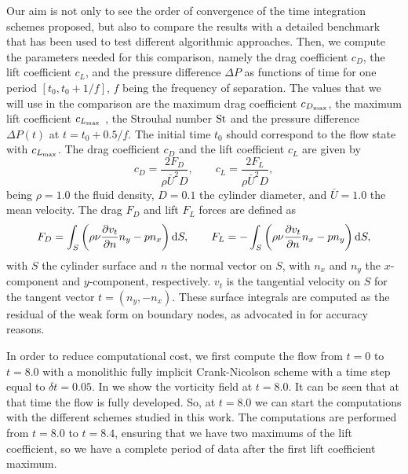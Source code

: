 Our aim is not only to see the order of convergence of the time integration schemes proposed, but also to compare the results with a detailed benchmark that has been used to test different algorithmic approaches. Then, we compute the parameters needed for this comparison, namely the drag coefficient $c_D$, the lift coefficient $c_L$, and the pressure difference $\Delta P$ as functions of time for one period $[t_0,t_0+1/f]$, $f$ being the frequency of separation. The values that we will use in the comparison are the maximum drag coefficient $c_{D_{\rm max}}$, the maximum lift coefficient $c_{L_{\rm max}}$ , the Strouhal number ${\rm St}$ and the pressure difference $\Delta P(t)$ at $t=t_0+0.5/f$. The initial time $t_0$ should correspond to the flow state with $c_{L_{\rm max}}$. The drag coefficient $c_D$ and  the lift coefficient $c_L$ are given by $$c_D=\frac{2F_D}{\rho\bar{U}^2D},\quad\quad c_L=\frac{2F_L}{\rho\bar{U}^2D},$$
being $\rho=1.0$ the fluid density, $D=0.1$ the cylinder diameter, and $\bar{U}=1.0$ the mean velocity. The drag $F_D$ and lift $F_L$ forces are defined as $$F_D=\int_S\left(\rho\nu\frac{\partial v_t}{\partial n}n_y-pn_x\right){\rm d}S,\quad\quad F_L=-\int_S\left(\rho\nu\frac{\partial v_t}{\partial n}n_x-pn_y\right){\rm d}S,$$
with $S$ the cylinder surface and $n$ the normal vector on $S$, with $n_x$ and $n_y$ the $x$-component and $y$-component, respectively. $v_t$ is the tangential velocity on $S$ for the tangent vector $t=(n_y,-n_x)$. These surface integrals are computed as the residual of the weak form on boundary nodes, as advocated in \cite{brezzi_variational_2001} for accuracy reasons.

In order to reduce computational cost, we first compute the flow from $t=0$ to $t=8.0$ with a monolithic fully implicit Crank-Nicolson scheme with a time step equal to $\delta t=0.05$. In  we show the vorticity field at $t=8.0$. It can be seen that at that time the flow is fully developed. So, at $t=8.0$ we can start the computations with the different schemes studied in this work. The computations are performed from $t=8.0$ to $t=8.4$, ensuring that we have two maximums of the lift coefficient, so we have a complete period of data after the first lift coefficient maximum. 

